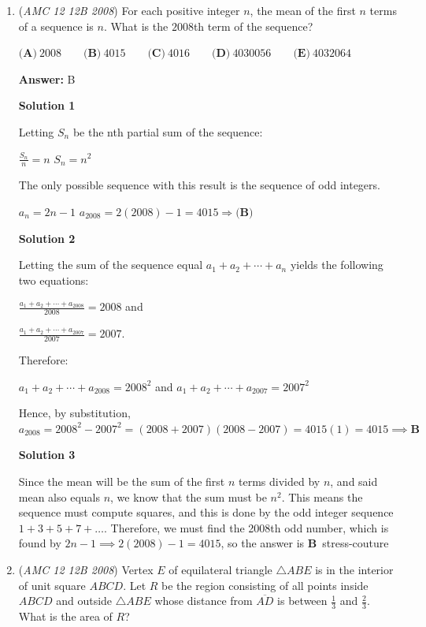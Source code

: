 \begin{enumerate}
 


	\item (\textit{AMC 12 12B 2008}) For each positive integer $n$, the mean of the first $n$ terms of a sequence is $n$. What is the $2008$th term of the sequence?


 $\textbf{(A)}\ 2008 \qquad \textbf{(B)}\ 4015 \qquad \textbf{(C)}\ 4016 \qquad \textbf{(D)}\ 4030056 \qquad \textbf{(E)}\ 4032064$

 \textbf{Answer: }B



\textbf{Solution 1}

Letting $S_n$ be the nth partial sum of the sequence:

 $\frac{S_n}{n} = n$
$S_n = n^2$

 The only possible sequence with this result is the sequence of odd integers.

 $a_n = 2n - 1$
$a_{2008} = 2(2008) - 1 = 4015 \Rightarrow \textbf{(B)}$




\textbf{Solution 2}

Letting the sum of the sequence equal $a_1+a_2+\cdots+a_n$ yields the following two equations:

 $\frac{a_1+a_2+\cdots+a_{2008}}{2008}=2008$ and

 $\frac{a_1+a_2+\cdots+a_{2007}}{2007}=2007$.

 Therefore:

 $a_1+a_2+\cdots+a_{2008}=2008^2$ and $a_1+a_2+\cdots+a_{2007}=2007^2$

 Hence, by substitution, $a_{2008}=2008^2-2007^2=(2008+2007)(2008-2007)=4015(1)=4015\implies\boxed{\textbf{B}}$




\textbf{Solution 3}

Since the mean will be the sum of the first $n$ terms divided by $n$, and said mean also equals $n$, we know that the sum must be $n^2$. This means the sequence must compute squares, and this is done by the odd integer sequence $1+3+5+7+\ldots$. Therefore, we must find the 2008th odd number, which is found by $2n-1 \implies 2(2008)-1 = 4015$, so the answer is $\boxed{\textbf{B}}$~stress-couture

 


	\item (\textit{AMC 12 12B 2008}) Vertex $E$ of equilateral triangle $\triangle ABE$ is in the interior of unit square $ABCD$. Let $R$ be the region consisting of all points inside $ABCD$ and outside $\triangle ABE$ whose distance from $\overline{AD}$ is between $\frac{1}{3}$ and $\frac{2}{3}$. What is the area of $R$?



\end{enumerate}

